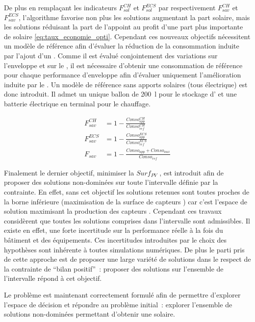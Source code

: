 De plus en remplaçant les indicateurs $F_{sol}^{CH}$ et $F_{sol}^{ECS}$ par respectivement
$F_{sav}^{CH}$ et $F_{sav}^{ECS}$, l’algorithme favorise non plus les solutions
augmentant la part solaire, mais les solutions réduisant la part de l’appoint au
profit d’une part plus importante de solaire \eqref{eq:taux_economie_opti}. Cependant ces nouveaux objectifs
nécessitent un modèle de référence afin d’évaluer la réduction de la consommation
induite par l’ajout d’un . Comme il est évalué conjointement des variations
sur l’enveloppe et sur le , il est nécessaire d’obtenir une consommation
de référence pour chaque performance d’enveloppe afin d’évaluer uniquement
l’amélioration induite par le . Un modèle de référence sans apports solaires
(tous électrique) est donc introduit. Il admet un unique ballon de \SI{200}{\litre} pour le stockage
d’ et une batterie électrique en terminal pour le chauffage.

\begin{align}\label{eq:taux_economie_opti}
  F_{sav}^{CH}   &= 1 - \frac{Conso_{app}^{CH}}{Conso_{ref}^{CH}} \\[10pt]
  F_{sav}^{ECS}  &= 1 - \frac{Conso_{app}^{ECS}}{Conso_{ref}^{ECS}} \\[10pt]
  F_{sav}        &= 1 - \frac{Conso_{app} + Conso_{aux}}{Conso_{ref}}
\end{align}

Finalement le dernier objectif, minimiser la $Surf_{PV}$ , est introduit afin de proposer des solutions non-dominées
sur toute l’intervalle définie par la contrainte. En effet, sans cet objectif les solutions
retenues sont toutes proches de la borne inférieure (maximisation de la surface de capteurs )
car c’est l’espace de solution maximisant la production des capteurs . Cependant ces travaux considèrent que
toutes les solutions comprises dans l’intervalle sont admissibles. Il existe en effet,
une forte incertitude sur la performance réelle à la fois du bâtiment et des équipements. Ces
incertitudes introduites par le choix des hypothèses sont inhérente à toutes simulations numériques.
De plus le parti pris de cette approche est de proposer une large variété de solutions dans le
respect de la contrainte de \enquote{bilan positif}~: proposer des solutions
sur l’ensemble de l’intervalle répond à cet objectif.

Le problème est maintenant correctement formulé afin de permettre d’explorer l’espace de décision et
répondre au problème initial~: explorer l’ensemble de solutions non-dominées permettant
d’obtenir une  solaire.



